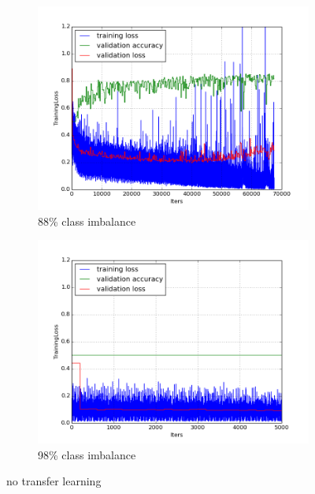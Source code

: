 \documentclass[a4paper,11pt]{article}
\begin{document}
\begin{figure}
    \centering
    \begin{minipage}[b]{\textwidth}
      \begin{subfigure}{.5\textwidth} 
        \centering
        \includegraphics[scale=0.4]{images/plot_clampdet_tl_wout.png}
        \caption{88\% class imbalance}\label{fig:2a}
      \end{subfigure}%
      \begin{subfigure}{.5\textwidth} 
        \centering
        \includegraphics[scale=0.4]{images/plot_clampdetCI98_tl_wout.png}
        \caption{98\% class imbalance}\label{fig:2b}
      \end{subfigure} \par \vspace*{20pt} %
      \caption{no transfer learning}\label{fig:2}
    \end{minipage}%
    \label{f43}
\end{figure}
\end{document}
